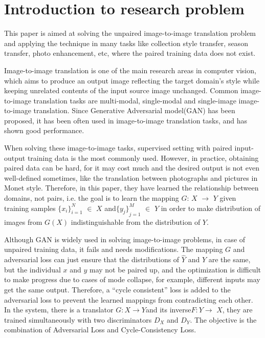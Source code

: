 \section{Introduction to research problem}

This paper is aimed at solving the unpaired image-to-image translation problem and applying the technique in many tasks like collection style transfer, season transfer, photo enhancement, etc, where the paired training data does not exist.

Image-to-image translation is one of the main research areas in computer vision, which aims to produce an output image reflecting the target domain’s style while keeping unrelated contents of the input source image unchanged. Common image-to-image translation tasks are multi-modal, single-modal and single-image image-to-image translation. Since Generative Adversarial model(GAN) has been proposed, it has been often used in image-to-image translation tasks, and has shown good performance.

When solving these image-to-image tasks, supervised setting with paired input-output training data is the most commonly used. However, in practice, obtaining paired data can be hard, for it may cost much and the desired output is not even well-defined sometimes, like the translation between photographs and pictures in Monet style. Therefore, in this paper, they have learned the relationship between domains, not pairs, i.e. the goal is to learn the mapping $G$: $X$ $\longrightarrow$ $Y$ given training samples $ {\{x_i\}}_{i=1}^N$ $\in$ $X$ and${\{y_j\}}_{j=1}^M$ $\in$ $Y$ in order to make distribution of images from $G(X)$ indistinguishable from the distribution of $Y$.

Although GAN is widely used in solving image-to-image problems, in case of unpaired training data, it fails and needs modifications. The mapping $G$ and adversarial loss can just ensure that the distributions of $\hat{Y}$ and $Y$ are the same, but the individual $x$ and $y$ may not be paired up, and the optimization is difficult to make progress due to cases of mode collapse, for example, different inputs may get the same output. Therefore, a “cycle consistent” loss is added to the adversarial loss to prevent the learned mappings from contradicting each other. In the system, there is a translator $G: X $$\longrightarrow$$ Y $and its inverse$ F: Y $$\longrightarrow$ $X$, they are trained simultaneously with two discriminators $D_{X}$ and $D_{Y}$. The objective is the combination of Adversarial Loss and Cycle-Consistency Loss.

